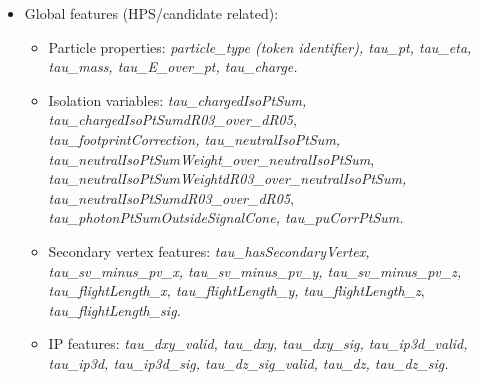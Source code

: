 \begin{itemize}
	\item Global features (HPS/\tauh candidate related):
	\begin{itemize}
		\item Particle properties: \textit{particle\_type (token identifier), tau\_pt, tau\_eta, tau\_mass, tau\_E\_over\_pt, tau\_charge.}
			
		\item Isolation variables: \textit{tau\_chargedIsoPtSum, tau\_chargedIsoPtSumdR03\_over\_dR05},\\ \textit{tau\_footprintCorrection, tau\_neutralIsoPtSum, tau\_neutralIsoPtSumWeight\_over\_neutralIsoPtSum},\\ \textit{tau\_neutralIsoPtSumWeightdR03\_over\_neutralIsoPtSum, tau\_neutralIsoPtSumdR03\_over\_dR05},\\ \textit{tau\_photonPtSumOutsideSignalCone, tau\_puCorrPtSum.}
		
		\item Secondary vertex features: \textit{tau\_hasSecondaryVertex, tau\_sv\_minus\_pv\_x, tau\_sv\_minus\_pv\_y, tau\_sv\_minus\_pv\_z, tau\_flightLength\_x, tau\_flightLength\_y, tau\_flightLength\_z},\\ \textit{tau\_flightLength\_sig.}
		
		\item IP features: \textit{tau\_dxy\_valid, tau\_dxy, tau\_dxy\_sig, tau\_ip3d\_valid, tau\_ip3d, tau\_ip3d\_sig, tau\_dz\_sig\_valid, tau\_dz, tau\_dz\_sig.}
	

\end{itemize}
\end{itemize}
